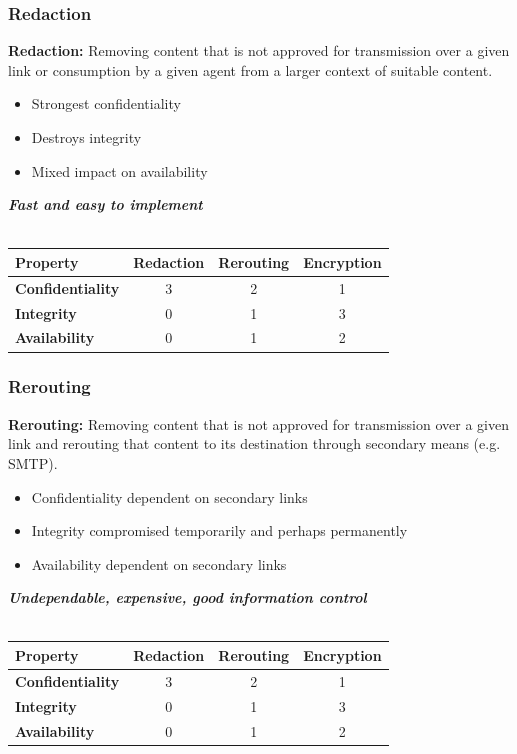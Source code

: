 \documentclass[t,handout]{beamer}
\begin{document}
\begin{frame}
\frametitle{Redaction}
{\bf Redaction:} {\small Removing content that is not approved for transmission over a given link or consumption by a given agent from a larger context of suitable content.} \\
\begin{itemize}
\item {\small Strongest confidentiality}
\item {\small Destroys integrity}
\item {\small Mixed impact on availability}
\end{itemize}
\begin{center}
{\bf \textit{Fast and easy to implement}}
\\~\\
\begin{small}
\begin{tabular}{lccc}
\toprule %
{\bf Property}			& {\bf Redaction}	& {\bf Rerouting} 	& {\bf Encryption} 	\\\toprule
{\bf Confidentiality} 	& 3				  	& 2					& 1				 	\\\midrule
{\bf Integrity}			& 0					& 1					& 3 					\\\midrule
{\bf Availability}		& 0					& 1					& 2					\\\bottomrule
\end{tabular}
\end{small}
\end{center}
\end{frame}

\begin{frame}
\frametitle{Rerouting}
{\bf Rerouting:} {\small Removing content that is not approved for transmission over a given link and rerouting that content to its destination through secondary means (e.g. SMTP).} \\
\begin{itemize}
\item {\small Confidentiality dependent on secondary links}
\item {\small Integrity compromised temporarily and perhaps permanently}
\item {\small Availability dependent on secondary links}
\end{itemize}
\begin{center}
{\bf \textit{Undependable, expensive, good information control}}
\\~\\
\begin{small}
\begin{tabular}{lccc}
\toprule %
{\bf Property}			& {\bf Redaction}	& {\bf Rerouting} 	& {\bf Encryption} 	\\\toprule
{\bf Confidentiality} 	& 3				  	& 2					& 1				 	\\\midrule
{\bf Integrity}			& 0					& 1					& 3 					\\\midrule
{\bf Availability}		& 0					& 1					& 2					\\\bottomrule
\end{tabular}
\end{small}
\end{center}
\end{frame}
\end{document}

